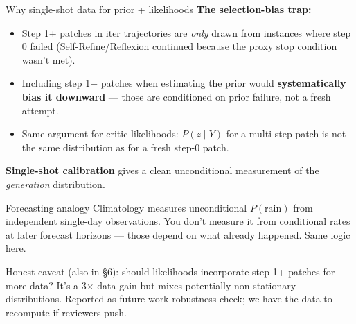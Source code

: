 \documentclass[10pt]{beamer}
\newcommand{\good}[1]{\textcolor{accentGreen}{\textbf{#1}}}
\newcommand{\bad}[1]{\textcolor{accentRed}{\textbf{#1}}}
\newcommand{\warn}[1]{\textcolor{accentOrange}{\textbf{#1}}}
\begin{document}
\begin{frame}{Why single-shot data for prior + likelihoods}
\vspace{0.15cm}
\warn{The selection-bias trap:}
\begin{itemize}
\item Step 1+ patches in iter trajectories are \emph{only} drawn from
instances where step 0 failed (Self-Refine/Reflexion continued because
the proxy stop condition wasn't met).
\item Including step 1+ patches when estimating the prior would
\bad{systematically bias it downward} --- those are conditioned on prior
failure, not a fresh attempt.
\item Same argument for critic likelihoods: $P(z\mid Y)$ for a multi-step
patch is not the same distribution as for a fresh step-0 patch.
\end{itemize}

\vspace{0.2cm}
\good{Single-shot calibration} gives a clean unconditional measurement of
the \emph{generation} distribution.

\vspace{0.25cm}
\begin{exampleblock}{Forecasting analogy}
Climatology measures unconditional $P(\text{rain})$ from independent
single-day observations. You don't measure it from conditional rates at later
forecast horizons --- those depend on what already happened. Same logic here.
\end{exampleblock}

\vspace{0.15cm}
\textcolor{softGrey}{\scriptsize Honest caveat (also in §6):
should likelihoods incorporate step 1+ patches for more data? It's a
3$\times$ data gain but mixes potentially non-stationary distributions.
Reported as future-work robustness check; we have the data to recompute if
reviewers push.}
\end{frame}
\end{document}
